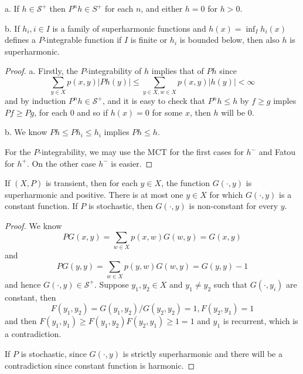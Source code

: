 \documentclass[lang=en,11pt,a4paper,citestyle =authoryear]{elegantpaper}
\newcommand{\Sar}{\mathcal{S}}
\begin{document}
\begin{lemma}
    a. If $h\in \Sar^+$ then $P^nh\in S^+$ for each $n$, and either $h = 0$ for $h>0$.\par
    b. If $h_i, i\in I$ is a family of superharmonic functions and $h(x) = \inf_Ih_i(x)$ defines a $P$-integrable function if $I$ is finite or $h_i$ is bounded below, then also $h$ is superharmonic.
\end{lemma}
\begin{proof}
    a. Firstly, the $P$-integrability of $h$ implies that of $Ph$ since
    \[
    \sum\limits_{y\in X}p(x,y)|Ph(y)| \leq \sum\limits_{y\in X, w\in X}p(x,y)|h(y)| < \infty
    \]
    and by induction $P^n h \in \Sar^+$, and it is easy to check that $P^n h \leq h$ by $f\geq g$ imples $Pf\geq Pg$, for each $0$ and so if $h(x) = 0$ for some $x$, then $h$ will be $0$.\par
    b. We know $Ph \leq Ph_i \leq h_i$ implies $Ph\leq h$.\par
    For the $P$-integrability, we may use the MCT for the first cases for $h^-$ and Fatou for $h^+$. On the other case $h^-$ is easier.
\end{proof}

\begin{lemma}
    If $(X,P)$ is transient, then for each $y\in X$, the function $G(\cdot,y)$ is superharmonic and positive. There is at most one $y\in X$ for which $G(\cdot,y)$ is a constant function. If $P$ is stochastic, then $G(\cdot,y)$ is non-constant for every $y$.
\end{lemma}
\begin{proof}
    We know
    \[
    PG(x,y) = \sum\limits_{w\in X}p(x,w)G(w,y) = G(x,y)
    \]
    and
    \[
    PG(y,y) = \sum\limits_{w\in X}p(y,w)G(w,y) = G(y,y) - 1
    \]
    and hence $G(\cdot,y) \in \Sar^+$. Suppose $y_1,y_2\in X$ and $y_1\neq y_2$ such that $G(\cdot,y_i)$ are constant, then
    \[
    F(y_1,y_2) = G(y_1,y_2)/G(y_2,y_2) = 1, F(y_2,y_1) = 1
    \]
    and then $F(y_1,y_1) \geq F(y_1,y_2)F(y_2,y_1) \geq 1 = 1$ and $y_1$ is recurrent, which is a contradiction.\par
    If $P$ is stochastic, since $G(\cdot,y)$ is strictly superharmonic and there will be a contradiction since constant function is harmonic.
\end{proof}
\end{document}
